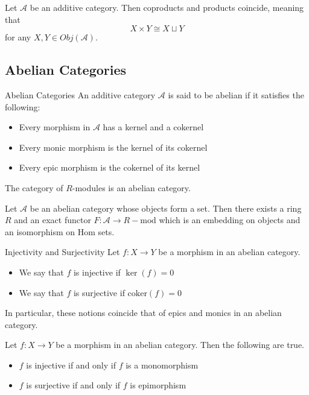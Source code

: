 \documentclass[a4paper]{article}
\begin{document}
\begin{lmm}{}{} Let $\mathcal{A}$ be an additive category. Then coproducts and products coincide, meaning that $$X\times Y\cong X\sqcup Y$$ for any $X,Y\in Obj(\mathcal{A})$. 
\end{lmm}

\subsection{Abelian Categories}
\begin{defn}{Abelian Categories}{} An additive category $\mathcal{A}$ is said to be abelian if it satisfies the following: 
\begin{itemize}
\item Every morphism in $\mathcal{A}$ has a kernel and a cokernel
\item Every monic morphism is the kernel of its cokernel
\item Every epic morphism is the cokernel of its kernel
\end{itemize}
\end{defn}

\begin{prp}{}{} The category of $R$-modules is an abelian category. 
\end{prp}

\begin{thm}{}{} Let $\mathcal{A}$ be an abelian category whose objects form a set. Then there exists a ring $R$ and an exact functor $F:\mathcal{A}\to R-\text{mod}$ which is an embedding on objects and an isomorphism on $\text{Hom}$ sets. 
\end{thm}

\begin{defn}{Injectivity and Surjectivity}{} Let $f:X\to Y$ be a morphism in an abelian category. 
\begin{itemize}
\item We say that $f$ is injective if $\ker(f)=0$
\item We say that $f$ is surjective if $\text{coker}(f)=0$
\end{itemize}
\end{defn}

In particular, these notions coincide that of epics and monics in an abelian category. 

\begin{prp}{}{} Let $f:X\to Y$ be a morphism in an abelian category. Then the following are true. 
\begin{itemize}
\item $f$ is injective if and only if $f$ is a monomorphism
\item $f$ is surjective if and only if $f$ is epimorphism
\end{itemize}
\end{prp}
\end{document}
